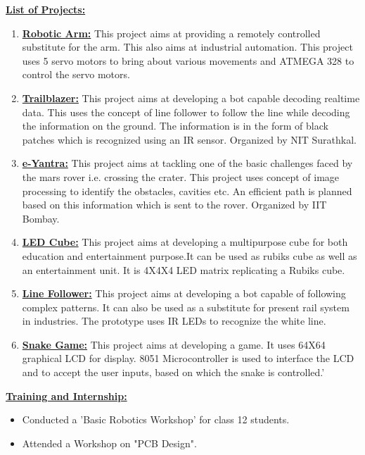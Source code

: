 \documentclass[10pt]{article}
\begin{document}
	\vspace{0.5cm}	
	\underline{\textbf{\Large{List of Projects:}}}
	\begin{enumerate}
		\item{\underline{\textbf{\large{Robotic Arm:}}} This project aims at providing a remotely controlled substitute for the arm. This   also aims at industrial automation. This   project uses 5 servo motors to bring about various movements and ATMEGA 328 to control the servo motors.}
		\item{\underline{\textbf{\large{Trailblazer:}}} This project aims at developing a bot capable decoding realtime data. This uses the concept of line follower to follow the line while decoding the information on the ground. The information is in the form of black patches which is recognized using an IR sensor. Organized by NIT Surathkal.}
		\item{\underline{\textbf{\large{e-Yantra:}}} This project aims at tackling one of the basic challenges faced by the mars rover i.e. crossing the crater. This project uses concept of image processing to identify the obstacles, cavities etc. An efficient path is planned based on this information which is sent to the rover. Organized by IIT Bombay.}
		\item{\underline{\textbf{\large{LED Cube:}}} This project aims at developing a multipurpose cube for both education and entertainment purpose.It can be used as rubiks cube as well as an entertainment unit. It is 4X4X4 LED matrix replicating a Rubiks cube.}
		\item{\underline{\textbf{\large{Line Follower:}}} This project aims at developing a bot capable of following complex patterns. It can also be used  as a substitute for present rail system in industries. The prototype uses IR LEDs to recognize the white line.}
		\item{\underline{\textbf{\large{Snake Game:}}} This project aims at developing a game. It uses 64X64 graphical LCD for display. 8051 Microcontroller is used to interface the LCD and to accept the user inputs, based on which the snake is controlled.'}
	\end{enumerate}
	
	\hfill
	
		\underline{\textbf{\Large{Training and Internship:}}}
		\begin{itemize}
			\item{Conducted a 'Basic Robotics Workshop' for class 12 students.}
			\item{Attended a Workshop on "PCB Design".}\\
		\end{itemize}
		
\end{document}
